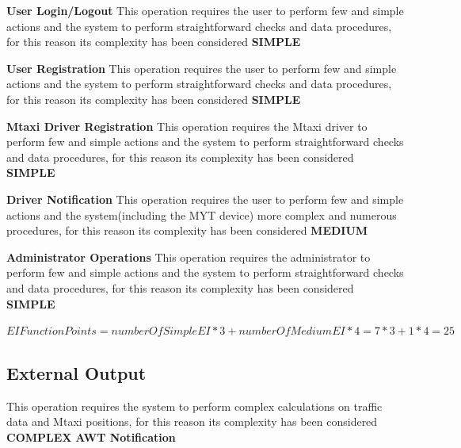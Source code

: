 \documentclass[11pt,titlepage]{article} %
\begin{document}
      \noindent \textbf{User Login/Logout}\newline
      This operation requires the user to perform few and simple actions and the system to perform straightforward checks and data procedures,
      for this reason its complexity has been considered \textbf{SIMPLE}\newline\newline
      
      \noindent \textbf{User Registration}\newline
      This operation requires the user to perform few and simple actions and the system to perform straightforward checks and data procedures,
      for this reason its complexity has been considered \textbf{SIMPLE}\newline\newline
      
      \noindent \textbf{Mtaxi Driver Registration}\newline
      This operation requires the Mtaxi driver to perform few and simple actions and the system to perform straightforward checks and data procedures,
      for this reason its complexity has been considered \textbf{SIMPLE}\newline\newline
      
      \noindent \textbf{Driver Notification}\newline
      This operation requires the user to perform few and simple actions and the system(including the MYT device) more complex and numerous procedures,
      for this reason its complexity has been considered \textbf{MEDIUM}\newline\newline
      
      \noindent \textbf{Administrator Operations}\newline
      This operation requires the administrator to perform few and simple actions and the system to perform straightforward checks and data procedures,
      for this reason its complexity has been considered \textbf{SIMPLE}\newline
      
      \begin{center}
	$ EI Function Points = numberOfSimpleEI * 3 + numberOfMediumEI * 4 = 7 * 3 + 1 * 4 = 25 $
      \end{center}
    
    \subsection{External Output}
      This operation requires the system to perform complex calculations on traffic data and Mtaxi positions, for this reason its complexity has been considered \textbf{COMPLEX}\newline\newline
      \textbf{AWT Notification}\newline
      
\end{document}
